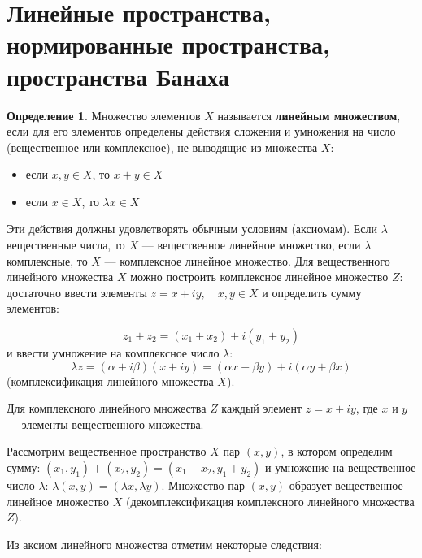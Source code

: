 \documentclass[12pt,a4paper,titlepage,oneside]{book}
\theoremstyle{definition}
\newtheorem*{definition}{Определение}
\theoremstyle{plain}
\theoremstyle{break}
\theoremstyle{remark}
\theoremstyle{remark}
\theoremstyle{remark}
\theoremstyle{remark}
\theoremstyle{plain}
\theoremstyle{plain}
\begin{document}
\section{Линейные пространства, нормированные пространства, пространства Банаха}

\begin{definition}

Множество элементов $X$ называется \textbf{линейным множеством}, если для его элементов определены действия сложения и умножения на число (вещественное или комплексное), не выводящие из множества $X$:

\begin{itemize}

	\item если $x,y\in X$, то $x+y\in X$

	\item если $x\in X$, то $\lambda x\in X$

\end{itemize}

\end{definition}


Эти действия должны удовлетворять обычным условиям (аксиомам). Если $\lambda$ вещественные числа, то $X$ --- вещественное линейное множество, если $\lambda$ комплексные, то $X$ --- комплексное линейное множество. Для вещественного линейного множества $X$ можно построить комплексное линейное множество $Z$: достаточно ввести элементы $z=x+iy,\quad x,y \in X$ и определить сумму элементов:

\begin{equation*}
z_1+z_2=(x_1+x_2)+i(y_1+y_2)
\end{equation*}
и ввести умножение на комплексное число $\lambda$:
\begin{equation*}
\lambda z = (\alpha + i\beta)(x+iy) = (\alpha x - \beta y)+i(\alpha y + \beta x)
\end{equation*}
(комплексификация линейного множества $X$).

Для комплексного линейного множества $Z$ каждый элемент $z=x+iy$, где $x$ и $y$ --- элементы вещественного множества.

Рассмотрим вещественное пространство $X$ пар $(x,y)$, в котором определим сумму: $(x_1,y_1)+(x_2,y_2) = (x_1+x_2,y_1+y_2)$ и умножение на вещественное число $\lambda$: $\lambda(x,y) = (\lambda x, \lambda y)$. Множество пар $(x,y)$ образует вещественное линейное множество  $X$ (декомплексификация комплексного линейного множества $Z$).

Из аксиом линейного множества отметим некоторые следствия:
\end{document}
